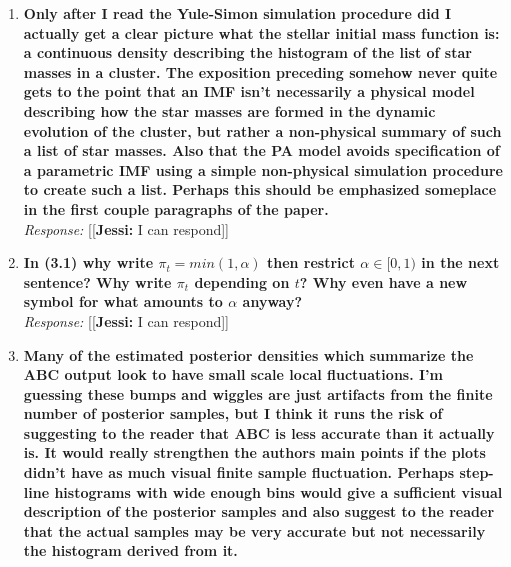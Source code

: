 \documentclass[11pt, oneside]{article}   	%
\newcommand{\jessi}[1]{{\color{blue}[[\textbf{Jessi: }#1]]}}
\begin{document}
\begin{enumerate}
\item {\bf Only after I read the Yule-Simon simulation procedure did I actually get a clear picture what the stellar initial mass function is: a continuous density describing the histogram of the list of star masses in a cluster. The exposition preceding somehow never quite gets to the point that an IMF isn't necessarily a physical model describing how the star masses are formed in the dynamic evolution of the cluster, but rather a non-physical summary of such a list of star masses. Also that the PA model avoids specification of a parametric IMF using a simple non-physical simulation procedure to create such a list. Perhaps this should be emphasized someplace in the first couple paragraphs of the paper.
} \\
\noindent \emph{Response:} \jessi{I can respond}
\bigskip

\item {\bf In (3.1) why write $\pi_t = min(1, \alpha)$  then restrict $\alpha \in [0, 1)$ in the next sentence? Why write $\pi_t$ depending on $t$? Why even have a new symbol for what amounts to $\alpha$ anyway?}\\
\noindent \emph{Response:} \jessi{I can respond}
\bigskip

\item {\bf Many of the estimated posterior densities which summarize the ABC output look to have small scale local fluctuations. I'm guessing these bumps and wiggles are just artifacts from the finite number of posterior samples, but I think it runs the risk of suggesting to the reader that ABC is less accurate than it actually is. It would really strengthen the authors main points if the plots didn't have as much visual finite sample fluctuation. Perhaps step-line histograms with wide enough bins would give a sufficient visual description of the posterior samples and also suggest to the reader that the actual samples may be very accurate but not necessarily the histogram derived from it. \\

}
\end{enumerate}
\end{document}
